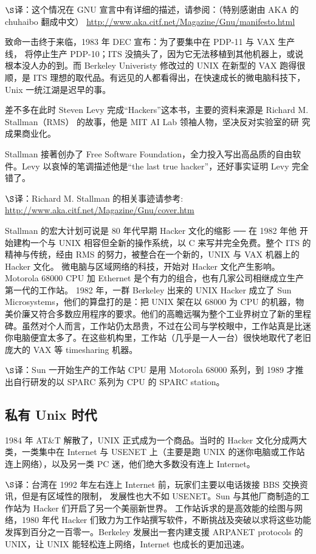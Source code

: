 $\S$译：这个情况在 GNU 宣言中有详细的描述，请参阅：（特别感谢由 AKA 的 chuhaibo 翻成中文） \url{http://www.aka.citf.net/Magazine/Gnu/manifesto.html}

致命一击终于来临，1983 年 DEC 宣布：为了要集中在 PDP-11 与 VAX 生产线， 将停止生产 PDP-10；ITS 没搞头了，因为它无法移植到其他机器上，或说根本没人办的到。而 Berkeley Univeristy 修改过的 UNIX 在新型的 VAX 跑得很顺，是 ITS 理想的取代品。有远见的人都看得出，在快速成长的微电脑科技下，Unix 一统江湖是迟早的事。

差不多在此时 Steven Levy 完成“Hackers”这本书，主要的资料来源是 Richard M. Stallman（RMS） 的故事，他是 MIT AI Lab 领袖人物，坚决反对实验室的研 究成果商业化。

Stallman 接著创办了 Free Software Foundation，全力投入写出高品质的自由软件。Levy 以哀悼的笔调描述他是“the last true hacker”，还好事实证明 Levy 完全错了。

$\S$译：Richard M. Stallman 的相关事迹请参考: \url{http://www.aka.citf.net/Magazine/Gnu/cover.htm}

Stallman 的宏大计划可说是 80 年代早期 Hacker 文化的缩影 ── 在 1982 年他 开始建构一个与 UNIX 相容但全新的操作系统，以 C 来写并完全免费。整个 ITS 的精神与传统，经由 RMS 的努力，被整合在一个新的，UNIX 与 VAX 机器上的 Hacker 文化。 微电脑与区域网络的科技，开始对 Hacker 文化产生影响。Motorola 68000 CPU 加 Ethernet 是个有力的组合，也有几家公司相继成立生产第一代的工作站。 1982 年，一群 Berkeley 出来的 UNIX Hacker 成立了 Sun Microsystems，他们的算盘打的是：把 UNIX 架在以 68000 为 CPU 的机器，物美价廉又符合多数应用程序的要求。他们的高瞻远嘱为整个工业界树立了新的里程碑。虽然对个人而言，工作站仍太昂贵，不过在公司与学校眼中，工作站真是比迷你电脑便宜太多了。在这些机构里，工作站（几乎是一人一台）很快地取代了老旧庞大的 VAX 等 timesharing 机器。

$\S$译：Sun 一开始生产的工作站 CPU 是用 Motorola 68000 系列，到 1989 才推出自行研发的以 SPARC 系列为 CPU 的 SPARC station。

\subsection{私有 Unix 时代}

1984 年 AT\&T 解散了，UNIX 正式成为一个商品。当时的 Hacker 文化分成两大类，一类集中在 Internet 与 USENET 上（主要是跑 UNIX 的迷你电脑或工作站连上网络），以及另一类 PC 迷，他们绝大多数没有连上 Internet。

$\S$译：台湾在 1992 年左右连上 Internet 前，玩家们主要以电话拨接 BBS 交换资讯，但是有区域性的限制， 发展性也大不如 USENET。Sun 与其他厂商制造的工作站为 Hacker 们开启了另一个美丽新世界。 工作站诉求的是高效能的绘图与网络，1980 年代 Hacker 们致力为工作站撰写软件，不断挑战及突破以求将这些功能发挥到百分之一百零一。Berkeley 发展出一套内建支援 ARPANET protocols 的 UNIX，让 UNIX 能轻松连上网络，Internet 也成长的更加迅速。

